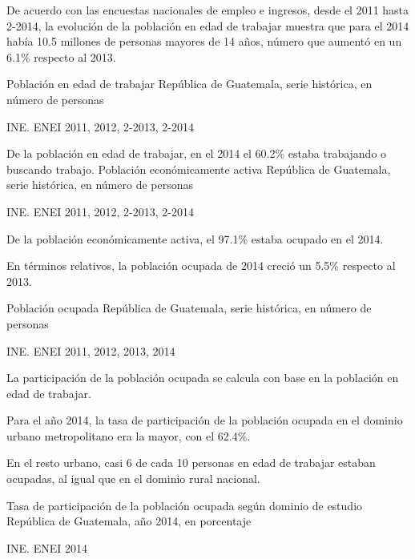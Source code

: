 
%
{%
	De acuerdo con las encuestas nacionales de empleo e ingresos, desde el 2011 hasta 2-2014\llamada, la evolución de la población en edad de trabajar muestra que para el 2014 había 10.5 millones de personas mayores de 14 años, número que aumentó en un 6.1\% respecto al 2013.
	
	}%
{%
	Población en edad de trabajar} %
{%
	República de Guatemala, serie histórica, en número de personas} %
{%
	\begin{tikzpicture}[x=1pt,y=1pt]    \end{tikzpicture}}%
{%
	INE. ENEI 2011, 2012, 2-2013, 2-2014} %



%
{%
	De la población en edad de trabajar, en el 2014 el 60.2\% estaba trabajando o buscando trabajo.
}%
{%
	Población económicamente activa} %
{%
	República de Guatemala, serie histórica, en número de personas} %
{%
	\begin{tikzpicture}[x=1pt,y=1pt]    \end{tikzpicture}}%
{%
	INE. ENEI 2011, 2012, 2-2013, 2-2014} %



%
{%
	De la población económicamente activa, el 97.1\% estaba ocupado en el 2014.
	
	En términos relativos, la población ocupada de 2014 creció un 5.5\% respecto al 2013.}%
{%
	Población ocupada} %
{%
	República de Guatemala, serie histórica, en número de personas} %
{%
	\begin{tikzpicture}[x=1pt,y=1pt]    \end{tikzpicture}}%
{%
	INE. ENEI 2011, 2012, 2013, 2014} %




%
{%
	La participación de la población ocupada se calcula con base en la población en edad de trabajar.
	
	Para el año 2014, la tasa de participación de la población ocupada en el dominio urbano metropolitano era la mayor, con el 62.4\%. 
	
	En el resto urbano, casi 6 de cada 10 personas en edad de trabajar estaban ocupadas, al igual que en el dominio rural nacional. }%
{%
	Tasa de participación de la población ocupada según dominio de estudio} %
{%
	República de Guatemala, año 2014, en porcentaje} %
{%
	\begin{tikzpicture}[x=1pt,y=1pt]    \end{tikzpicture}}%
{%
	INE. ENEI 2014} %


